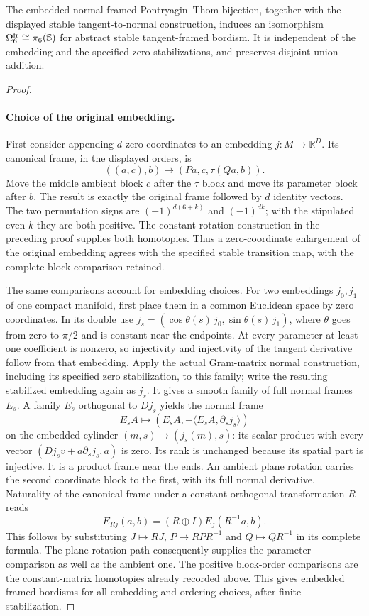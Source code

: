 \begin{proposition}
\label{courseIII:pt-abstract-framed-comparison}
The embedded normal-framed Pontryagin--Thom bijection, together with the
displayed stable tangent-to-normal construction, induces an isomorphism
$\Omega^{\rm fr}_6\cong\pi_6(\mathbb S)$ for abstract stable
tangent-framed bordism.  It is independent of the embedding and the
specified zero stabilizations, and preserves disjoint-union addition.
\end{proposition}

\begin{proof}
\paragraph{Choice of the original embedding.}
First consider appending $d$ zero coordinates to an embedding
$j:M\to\mathbb R^D$.  Its canonical frame, in the displayed orders,
is
\[
 ((a,c),b)\longmapsto(Pa,c,\tau(Qa,b)).
\]
Move the middle ambient block $c$ after the $\tau$ block and move its
parameter block after $b$.  The result is exactly the original frame
followed by $d$ identity vectors.  The two permutation signs are
$(-1)^{d(6+k)}$ and $(-1)^{dk}$; with the stipulated even $k$ they
are both positive.  The constant rotation construction in the preceding
proof supplies both homotopies.  Thus a zero-coordinate enlargement of
the original embedding agrees with the specified stable transition map,
with the complete block comparison retained.

The same comparisons account for embedding choices.  For two embeddings
$j_0,j_1$ of one compact manifold, first place them in a common Euclidean
space by zero coordinates.  In its double use
$j_s=(\cos\theta(s)\,j_0,\sin\theta(s)\,j_1)$, where $\theta$
goes from zero to $\pi/2$ and is constant near the endpoints.  At
every parameter at least one coefficient is nonzero, so injectivity
and injectivity of the tangent derivative follow from that embedding.
Apply the actual Gram-matrix normal construction, including its specified
zero stabilization, to this family; write the resulting stabilized
embedding again as $j_s$.  It gives a smooth family of full normal
frames $E_s$.  A family $E_s$ orthogonal to $Dj_s$ yields the
normal frame
\[
 E_s A\longmapsto
       (E_s A,-\langle E_s A,\partial_sj_s\rangle)
\]
on the embedded cylinder $(m,s)\mapsto(j_s(m),s)$: its scalar product
with every vector $(Dj_s v+a\partial_sj_s,a)$ is zero.  Its rank is
unchanged because its spatial part is injective.  It is a product frame
near the ends.  An ambient plane rotation carries the second coordinate
block to the first, with its full normal derivative.  Naturality of the
canonical frame under a constant orthogonal transformation $R$ reads
\[
 E_{Rj}(a,b)=(R\oplus I)E_j(R^{-1}a,b).
\]
This follows by substituting $J\mapsto RJ$, $P\mapsto RPR^{-1}$
and $Q\mapsto QR^{-1}$ in its complete formula.  The plane rotation
path consequently supplies the parameter comparison as well as the
ambient one.  The positive block-order comparisons are the
constant-matrix homotopies already recorded above.  This gives embedded framed bordisms for all
embedding and ordering choices, after finite stabilization.


\end{proof}

